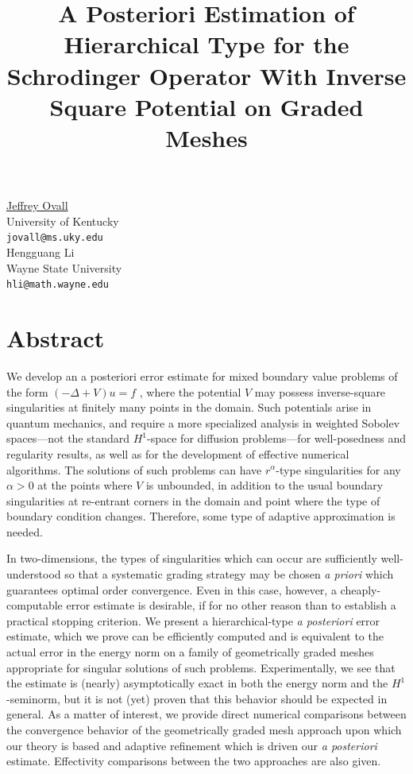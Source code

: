 \documentclass[article, A4, 11pt]{llncs}%
\begin{document}
\title{A Posteriori Estimation of Hierarchical Type for the  Schrodinger Operator With Inverse Square Potential on Graded Meshes}
 \author{} \institute{}
\maketitle
\begin{center}
{\large \underline{Jeffrey Ovall}}\\
University of Kentucky\\
{\tt jovall@ms.uky.edu}
\\ \vspace{4mm}
{\large Hengguang Li}\\
Wayne State University\\
{\tt hli@math.wayne.edu}
\end{center}

\section*{Abstract}

We develop an a posteriori error estimate for mixed boundary value problems of the form $(-\Delta + V )u = f$ , where the potential $V$ may possess inverse-square singularities at finitely many points in the domain. Such potentials arise in quantum mechanics, and require
a more specialized analysis in weighted Sobolev spaces---not the standard $H^1$-space for diffusion problems---for well-posedness and regularity results, as well as for the 
development of effective numerical algorithms.  The solutions of such problems can have
$r^{\alpha}$-type singularities for any $\alpha>0$ at the points where $V$ is unbounded,
in addition to the usual boundary singularities at re-entrant corners in the domain and
point where the type of boundary condition changes.  Therefore, some type of adaptive approximation is needed.  

In two-dimensions, the types of singularities which can occur are sufficiently well-understood so that a systematic grading strategy may be chosen \textit{a priori} which guarantees optimal order convergence.  Even in this case, however, a cheaply-computable error estimate is desirable, if for no other reason than to establish a practical stopping criterion.  We present a hierarchical-type \textit{a posteriori} error estimate, which we prove can be efficiently computed and is equivalent to the actual error in the energy norm on a family of geometrically graded meshes appropriate for singular solutions of such problems.  Experimentally, we see that the estimate is (nearly) asymptotically exact in both the energy norm and the $H^1$-seminorm, but it is not (yet) proven that this behavior should be expected in general.  As a matter of interest, we provide direct numerical comparisons between the convergence behavior of the geometrically graded mesh approach upon which our theory is based and adaptive refinement which is driven our \textit{a posteriori} estimate.  Effectivity comparisons between the two approaches are also given.
\end{document}
